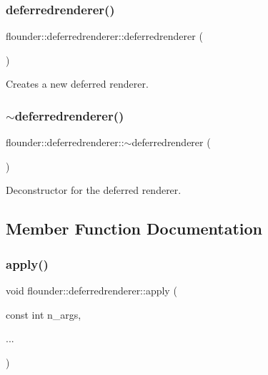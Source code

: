\subsubsection{\texorpdfstring{deferredrenderer()}{deferredrenderer()}}
{\footnotesize\ttfamily flounder\+::deferredrenderer\+::deferredrenderer (\begin{DoxyParamCaption}{ }\end{DoxyParamCaption})}



Creates a new deferred renderer. 

\mbox{\label{classflounder_1_1deferredrenderer_a7b884375d735aa7670be432b7567ec0b}} 
\subsubsection{\texorpdfstring{$\sim$deferredrenderer()}{~deferredrenderer()}}
{\footnotesize\ttfamily flounder\+::deferredrenderer\+::$\sim$deferredrenderer (\begin{DoxyParamCaption}{ }\end{DoxyParamCaption})}



Deconstructor for the deferred renderer. 



\subsection{Member Function Documentation}
\mbox{\label{classflounder_1_1deferredrenderer_af369386b3a61385cd8ec2444662599c3}} 
\subsubsection{\texorpdfstring{apply()}{apply()}}
{\footnotesize\ttfamily void flounder\+::deferredrenderer\+::apply (\begin{DoxyParamCaption}\item[{const int}]{n\+\_\+args,  }\item[{}]{... }\end{DoxyParamCaption})}



